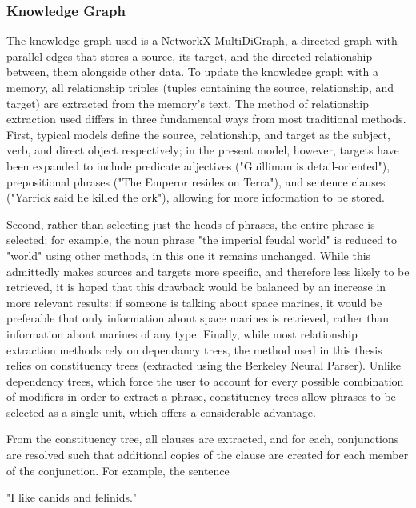 \subsubsection{Knowledge Graph}

The knowledge graph used is a NetworkX MultiDiGraph, a directed graph with parallel edges that stores a source, its target, and the directed relationship between, them alongside other data. To update the knowledge graph with a memory, all relationship triples (tuples containing the source, relationship, and target) are extracted from the memory's text. The method of relationship extraction used differs in three fundamental ways from most traditional methods. First, typical models define the source, relationship, and target as the subject, verb, and direct object respectively; in the present model, however, targets have been expanded to include predicate adjectives ("Guilliman is detail-oriented"), prepositional phrases ("The Emperor resides on Terra"), and sentence clauses ("Yarrick said he killed the ork"), allowing for more information to be stored. 

Second, rather than selecting just the heads of phrases, the entire phrase is selected: for example, the noun phrase "the imperial feudal world" is reduced to "world" using other methods, in this one it remains unchanged. While this admittedly makes sources and targets more specific, and therefore less likely to be retrieved, it is hoped that this drawback would be balanced by an increase in more relevant results: if someone is talking about space marines, it would be preferable that only information about space marines is retrieved, rather than information about marines of any type. Finally, while most relationship extraction methods rely on dependancy trees, the method used in this thesis relies on constituency trees (extracted using the Berkeley Neural Parser). Unlike dependency trees, which force the user to account for every possible combination of modifiers in order to extract a phrase, constituency trees allow phrases to be selected as a single unit, which offers a considerable advantage.

From the constituency tree, all clauses are extracted, and for each, conjunctions are resolved such that additional copies of the clause are created for each member of the conjunction. For example, the sentence

\begin{displayquote}
"I like canids and felinids."
\end{displayquote}

